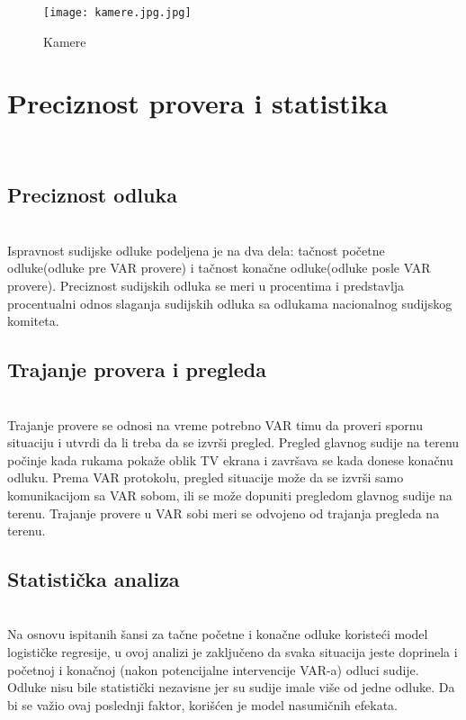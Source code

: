 \documentclass[a4paper]{article}
\begin{document}
\begin{figure}[h!]
\begin{center}
\texttt{[image: kamere.jpg.jpg]}
\end{center}
\caption{Kamere}
\label{kamere.jpg.jpg}
\end{figure}

\section{Preciznost provera i statistika} \\

\subsection{Preciznost odluka} \\

Ispravnost sudijske odluke podeljena je na dva dela: tačnost početne odluke(odluke pre VAR provere) i tačnost konačne odluke(odluke posle VAR provere). Preciznost sudijskih odluka se meri u procentima i predstavlja procentualni odnos slaganja sudijskih odluka sa odlukama nacionalnog sudijskog komiteta. \\

\subsection{Trajanje provera i pregleda} \\
Trajanje provere se odnosi na vreme potrebno VAR timu da proveri spornu situaciju i utvrdi da li treba da se izvrši pregled. Pregled glavnog sudije na terenu počinje kada rukama pokaže oblik TV ekrana i završava se kada donese konačnu odluku. Prema VAR protokolu, pregled situacije može da se izvrši samo komunikacijom sa VAR sobom, ili se može dopuniti pregledom glavnog sudije na terenu. Trajanje provere u VAR sobi meri se odvojeno od trajanja pregleda na terenu.\\

 \subsection{Statistička analiza}\\

Na osnovu ispitanih šansi za tačne početne i konačne odluke koristeći model logističke regresije, u ovoj analizi je zaključeno da svaka situacija jeste doprinela i početnoj i konačnoj (nakon potencijalne intervencije VAR-a) odluci sudije. Odluke nisu bile statistički nezavisne jer su sudije imale više od jedne odluke. Da bi se važio ovaj poslednji faktor, korišćen je model nasumičnih efekata. \\
\end{document}
